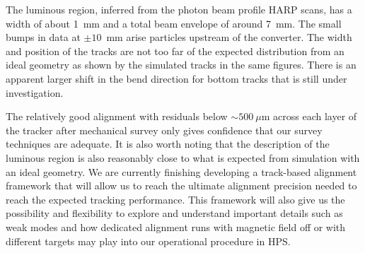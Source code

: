The luminous region, inferred from the photon beam profile HARP 
scans, has a width of about 1~mm 
and a total beam envelope of around 7~mm. The small bumps in data at $\pm10$~mm 
arise particles upstream of the converter. The width and position of the tracks 
are not too far of the expected distribution from an ideal geometry as shown by the simulated 
tracks in the same figures. There is an apparent larger shift in the bend direction for bottom tracks 
that is still under investigation. 

The relatively good alignment with residuals below $\sim 500~\mu$m across each layer of 
the tracker after mechanical survey only gives confidence that our survey techniques are adequate. 
It is also worth noting that the description of the luminous region is also reasonably close to what 
is expected from simulation with an ideal geometry. We are currently finishing developing 
a track-based alignment framework that will allow us to reach 
the ultimate alignment precision needed to reach the expected tracking performance. 
This framework will also give us the possibility and 
flexibility  to explore and understand important details such as weak modes and how dedicated alignment runs with magnetic field off or with different targets may play into our operational 
procedure in HPS.
